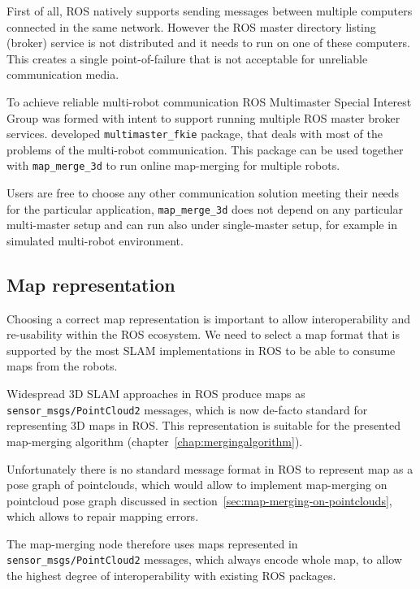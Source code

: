 First of all, \gls{ROS} natively supports sending messages between multiple computers connected in the same network. However the \gls{ROS} master directory listing (broker) service is not distributed and it needs to run on one of these computers. This creates a single point-of-failure that is not acceptable for unreliable communication media.

To achieve reliable multi-robot communication \gls{ROS} Multimaster Special Interest Group was formed with intent to support running multiple \gls{ROS} master broker services. \citet{hernadez2015multi} developed \texttt{multimaster\_fkie} package, that deals with most of the problems of the multi-robot communication. This package can be used together with \texttt{map\_merge\_3d} to run online map-merging for multiple robots.

Users are free to choose any other communication solution meeting their needs for the particular application, \texttt{map\_merge\_3d} does not depend on any particular multi-master setup and can run also under single-master setup, for example in simulated multi-robot environment.

\subsection{Map representation}
\label{sec:map-representation}

Choosing a correct map representation is important to allow interoperability and re-usability within the \gls{ROS} ecosystem. We need to select a map format that is supported by the most \gls{SLAM} implementations in \gls{ROS} to be able to consume maps from the robots.

Widespread \gls{3D} \gls{SLAM} approaches in \gls{ROS} produce maps as \texttt{sen\-sor\_msgs/\-Point\-Cloud2} messages, which is now de-facto standard for representing \gls{3D} maps in \gls{ROS}. This representation is suitable for the presented map-merging algorithm (chapter~\ref{chap:mergingalgorithm}).

Unfortunately there is no standard message format in \gls{ROS} to represent map as a pose graph of pointclouds, which would allow to implement map-merging on pointcloud pose graph discussed in section~\ref{sec:map-merging-on-pointclouds}, which allows to repair mapping errors.

The map-merging node therefore uses maps represented in \texttt{sen\-sor\_msgs/\-Point\-Cloud2} messages, which always encode whole map, to allow the highest degree of interoperability with existing \gls{ROS} packages.

